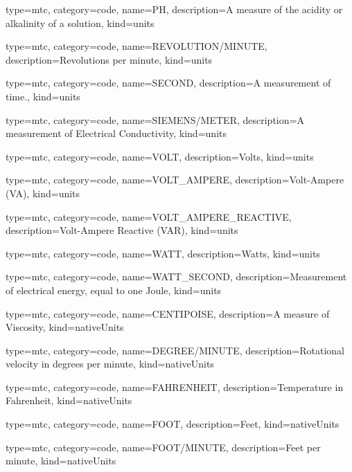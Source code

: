 {
  type=mtc,
  category=code,
  name={PH},
  description={A measure of the acidity or alkalinity of a solution},
  kind={units}
}


{
  type=mtc,
  category=code,
  name={REVOLUTION/MINUTE},
  description={Revolutions per minute},
  kind={units}
}


{
  type=mtc,
  category=code,
  name={SECOND},
  description={A measurement of time.},
  kind={units}
}


{
  type=mtc,
  category=code,
  name={SIEMENS/METER},
  description={A measurement of Electrical Conductivity},
  kind={units}
}


{
  type=mtc,
  category=code,
  name={VOLT},
  description={Volts},
  kind={units}
}


{
  type=mtc,
  category=code,
  name={VOLT\_AMPERE},
  description={Volt-Ampere  (VA)},
  kind={units}
}


{
  type=mtc,
  category=code,
  name={VOLT\_AMPERE\_REACTIVE},
  description={Volt-Ampere Reactive  (VAR)},
  kind={units}
}


{
  type=mtc,
  category=code,
  name={WATT},
  description={Watts},
  kind={units}
}


{
  type=mtc,
  category=code,
  name={WATT\_SECOND},
  description={Measurement of electrical energy, equal to one Joule},
  kind={units}
}


{
  type=mtc,
  category=code,
  name={CENTIPOISE},
  description={A measure of Viscosity},
  kind={nativeUnits}
}


{
  type=mtc,
  category=code,
  name={DEGREE/MINUTE},
  description={Rotational velocity in degrees per minute},
  kind={nativeUnits}
}


{
  type=mtc,
  category=code,
  name={FAHRENHEIT},
  description={Temperature in Fahrenheit},
  kind={nativeUnits}
}


{
  type=mtc,
  category=code,
  name={FOOT},
  description={Feet},
  kind={nativeUnits}
}


{
  type=mtc,
  category=code,
  name={FOOT/MINUTE},
  description={Feet per minute},
  kind={nativeUnits}
}


